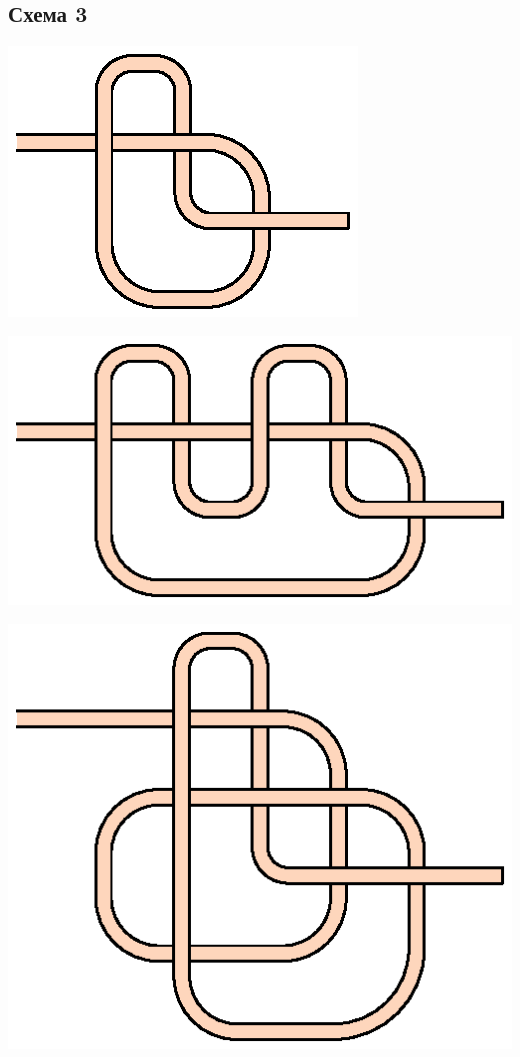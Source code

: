 \subsection{Схема 3}
\graphicspath{{\currentpath}}

\includegraphics{images/s-03-a1b1.eps}

\includegraphics{images/s-03-a1b2.eps}

\includegraphics{images/s-03-a2b1.eps}

